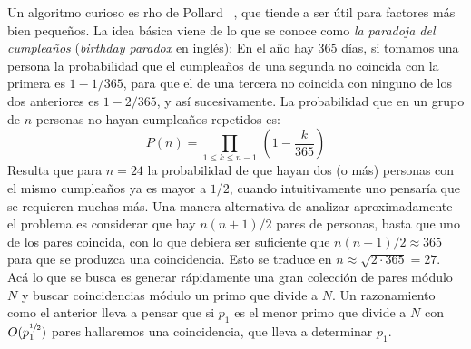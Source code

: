   Un algoritmo curioso es rho de Pollard~%
    \cite{pollard75:_rho_factorization},%
  que tiende a ser útil para factores más bien pequeños.
  La idea básica viene
  de lo que se conoce como \emph{la paradoja del cumpleaños}%
  (\emph{\foreignlanguage{english}{birthday paradox}} en inglés):%
  En el año hay \(365\) días,
  si tomamos una persona la probabilidad
  que el cumpleaños de una segunda no coincida con la primera
  es \(1 - 1 / 365\),
  para que el de una tercera
  no coincida con ninguno de los dos anteriores
  es \(1 - 2 / 365\),
  y así sucesivamente.
  La probabilidad que en un grupo de \(n\) personas
  no hayan cumpleaños repetidos es:
  \begin{equation*}
    P(n)
      = \prod_{1 \le k \le n - 1} \, \left( 1 - \frac{k}{365} \right)
  \end{equation*}
  Resulta que para \(n = 24\)
  la probabilidad de que hayan dos (o más)
  personas con el mismo cumpleaños ya es mayor a \(1 / 2\),
  cuando intuitivamente uno pensaría que se requieren muchas más.
  Una manera alternativa de analizar aproximadamente el problema%
  es considerar que hay
  \(n (n + 1) / 2\) pares de personas,
  basta que uno de los pares coincida,
  con lo que debiera ser suficiente
  que \(n (n + 1) / 2 \approx 365\)
  para que se produzca una coincidencia.
  Esto se traduce en \(n \approx \sqrt{2 \cdot 365} = 27\).
  Acá lo que se busca es generar rápidamente
  una gran colección de pares
  módulo \(N\)
  y buscar coincidencias módulo un primo que divide a \(N\).
  Un razonamiento como el anterior
  lleva a pensar que si \(p_1\) es el menor primo que divide a \(N\)
  con \(O(p_1^{\sfrac{1}{2}})\) pares hallaremos una coincidencia,
  que lleva a determinar \(p_1\).

